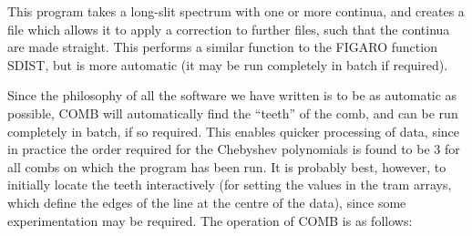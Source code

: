 This program takes a long-slit spectrum with one or more continua, and
creates a file which allows it to apply a correction to further files,
such that the continua are made straight.
This performs a similar function to the FIGARO function SDIST, but is
more automatic (it may be run completely in batch if required).

Since the philosophy of all the software we have written is to be as
automatic as possible, COMB will automatically find the ``teeth'' of
the comb, and can be run completely in batch, if so required. This
enables quicker processing of data, since in practice the order
required for the Chebyshev polynomials is
found to be 3 for all combs on which the program has been run. It is
probably best, however, to initially locate the teeth interactively
(for setting the values in the tram arrays, which define the edges of
the line at the centre of the data), since some experimentation may be
required. The operation of COMB is as follows:

